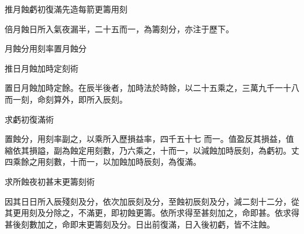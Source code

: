 \begin{pinyinscope}
 推月蝕虧初復滿先造每箭更籌用刻



 倍月蝕日所入氣夜漏半，二十五而一，為籌刻分，亦注于歷下。



 月蝕分用刻率置月蝕分



 推日月蝕加時定刻術



 置日月蝕加時定餘。在辰半後者，加時法於時餘，以二十五乘之，三萬九千一十八而一刻，命刻算外，即所入辰刻。



 求虧初復滿術



 置蝕分，用刻率副之，以乘所入歷損益率，四千五十七
 而一。值盈反其損益，值縮依其損謚，副為蝕定用刻數，乃六乘之，十而一，以減蝕加時辰刻，為虧初。丈四乘餘之用刻數，十而一，以加蝕加時辰刻，為復滿。



 求所蝕夜初甚末更籌刻術



 因其日日所入辰殘刻及分，依次加辰刻及分，至蝕初辰刻及分，減二刻十二分，從其更用刻及分除之，不滿更，即初蝕更籌。依所求得至甚刻加之，命即甚。依求得甚後刻數加之，命即末更籌刻及分。日出前復滿，日入後初虧，皆不注蝕。



\end{pinyinscope}